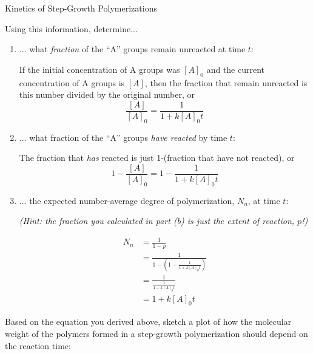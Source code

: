 \begin{activity}{Kinetics of Step-Growth Polymerizations}
\begin{ctqs}

	\question Using this information, determine...
	
		\begin{enumerate}
			\item ... what \emph{fraction} of the ``A'' groups remain unreacted at time $t$:
			
				\begin{solution}[1in]
					If the initial concentration of A groups was $[A]_0$ and the current concentration of A groups is $[A]$, then the fraction that remain unreacted is this number divided by the original number, or
					\begin{equation*}
						\frac{[A]}{[A]_0} = \frac{1}{1 + k[A]_0 t}
					\end{equation*}
				\end{solution}
			
			\item ... what fraction of the ``A'' groups \emph{have reacted} by time $t$:
			
				\begin{solution}[1in]
					The fraction that \emph{has} reacted is just 1-(fraction that have not reacted), or
					\begin{equation*}
						1- \frac{[A]}{[A]_0} = 1-\frac{1}{1 + k[A]_0 t}
					\end{equation*}
				\end{solution}
		
			\item ... the expected number-average degree of polymerization, $N_n$, at time $t$: \label{\labelbase:ctq:catNn}
			
				\emph{(Hint: the fraction you calculated in part (b) is just the extent of reaction, $p$!)}
			
				\begin{solution}[1.75in]
					\begin{align*}
						N_n &= \frac{1}{1-p}\\
							&= \frac{1}{1-\left(1- \frac{1}{1 + k[A]_0 t}\right)}\\
							&= \frac{1}{\frac{1}{1 + k[A]_0 t}}\\
							&= 1 + k[A]_0 t
					\end{align*}
				\end{solution}
			
		\end{enumerate}
	
	\question Based on the equation you derived above, sketch a plot of how the molecular weight of the polymers formed in a step-growth polymerization should depend on the reaction time:
	

\end{ctqs}
\end{activity}
